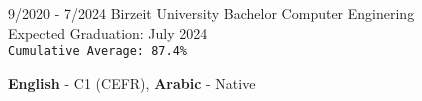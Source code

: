 \documentclass[9pt]{developercv} %
\begin{document}
\vspace{-10 pt}
\begin{entrylist}
    \entry
		{9/2020 - 7/2024}
		{Birzeit University}
		{Bachelor}
		{Computer Enginering\\
        Expected Graduation: July 2024\\
        \texttt{Cumulative Average: 87.4\%}
        }

\end{entrylist}




\vspace{-10 pt}
    \vspace{-6pt}
    
    \hspace{26mm} \textbf{English} - C1 (CEFR), \textbf{ Arabic} - Native
\end{document}
